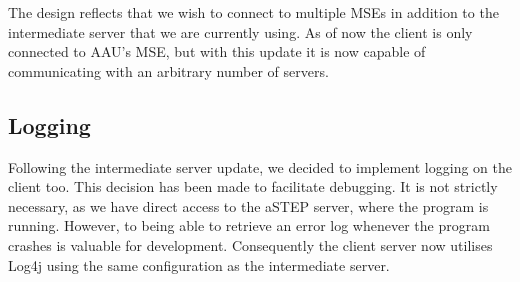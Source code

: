 The design reflects that we wish to connect to multiple MSEs in addition to the intermediate server that we are currently using. As of now the client is only connected to AAU's MSE, but with this update it is now capable of communicating with an arbitrary number of servers.

\subsection*{Logging}
Following the intermediate server update, we decided to implement logging on the client too. This decision has been made to facilitate debugging. It is not strictly necessary, as we have direct access to the aSTEP server, where the program is running. However, to being able to retrieve an error log whenever the program crashes is valuable for development. Consequently the client server now utilises Log4j \cite{log4j} using the same configuration as the intermediate server.